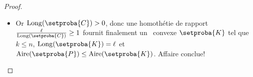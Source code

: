 \begin{proof}
\begin{itemize}
		\item Or $\cyclelen{\setproba{C}} > 0$, donc une homothétie de rapport $\frac{\ell}{\cyclelen{\setproba{C}}} \geq 1$ fournit finalement un \kgone\ convexe $\setproba{K}$ tel que
		$k \leq n$,
		$\cyclelen{\setproba{K}} = \ell$
		et
		$\area{\setproba{P}} \leq \area{\setproba{K}}$.
		Affaire conclue!
	\end{itemize}

	\null\vspace{-6ex}
\end{proof}
